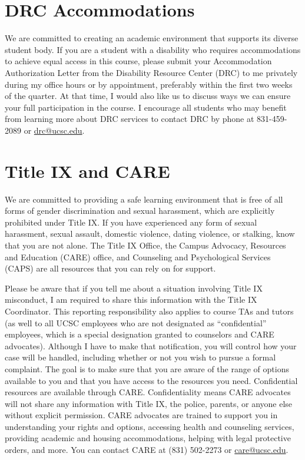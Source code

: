 \documentclass{article}
\begin{document}
\section{DRC Accommodations}
We are committed to creating an academic environment that
supports its diverse student body. If you are a student with a
disability who requires accommodations to achieve equal access in
this course, please submit your Accommodation Authorization Letter
from the Disability Resource Center (DRC) to me privately during
my office hours or by appointment, preferably within the first two
weeks of the quarter. At that time, I would also like us to discuss
ways we can ensure your full participation in the course. I encourage
all students who may benefit from learning more about DRC services
to contact DRC by phone at 831-459-2089 or \url{drc@ucsc.edu}.

\section{Title IX and CARE}
We are committed to providing a safe learning environment
that is free of all forms of gender discrimination and sexual
harassment, which are explicitly prohibited under Title IX. If you
have experienced any form of sexual harassment, sexual assault,
domestic violence, dating violence, or stalking, know that you are
not alone. The Title IX Office, the Campus Advocacy, Resources and
Education (CARE) office, and Counseling and Psychological Services
(CAPS) are all resources that you can rely on for support.  

Please
be aware that if you tell me about a situation involving Title IX
misconduct, I am required to share this information with the Title
IX Coordinator. This reporting responsibility also applies to course
TAs and tutors (as well to all UCSC employees who are not designated
as ``confidential'' employees, which is a special designation granted
to counselors and CARE advocates). Although I have to make that
notification, you will control how your case will be handled,
including whether or not you wish to pursue a formal complaint. The
goal is to make sure that you are aware of the range of options
available to you and that you have access to the resources you need.
Confidential resources are available through CARE. Confidentiality
means CARE advocates will not share any information with Title IX,
the police, parents, or anyone else without explicit permission.
CARE advocates are trained to support you in understanding your
rights and options, accessing health and counseling services,
providing academic and housing accommodations, helping with legal
protective orders, and more. You can contact CARE at (831) 502-2273
or \url{care@ucsc.edu}.  
\end{document}
